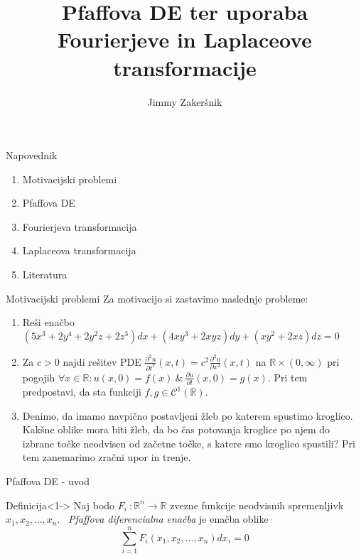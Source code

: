 \documentclass[t, 10pt]{beamer} %
\title{Pfaffova DE ter uporaba Fourierjeve in Laplaceove transformacije}
\author{Jimmy Zakeršnik}
\institute{Fakulteta za naravoslovje in matematiko}
\newcommand{\mth}[1]{\ensuremath{\mathbb{#1}}}
\newcommand{\R}{\mth{R}}
\newcommand{\pojem}[1]{\emph{#1}}
\newcommand{\map}[3]{\ensuremath{{#1}~: {#2} \rightarrow {#3}}}
\newcommand{\fillblack}[1]{
	\begin{tikzpicture}[remember picture, overlay]
		\node [shift={(0 cm,0cm)}]  at (current page.south west)
		{%
			\begin{tikzpicture}[remember picture, overlay] at (current page.south west)
				\draw [fill=black] (0, 0) -- (0,#1 \paperheight) --
				(\paperwidth,#1 \paperheight) -- (\paperwidth,0) -- cycle ;
			\end{tikzpicture}
		};
		\draw (current page.north west) rectangle (current page.south east);
	\end{tikzpicture}
}
\begin{document}
	
	\begin{frame}
		\maketitle
	\end{frame}
	
	\begin{frame}{Napovednik}
		\begin{enumerate}
			\item Motivacijski problemi
			\item Pfaffova DE
			\item Fourierjeva transformacija
			\item Laplaceova transformacija
			\item Literatura
		\end{enumerate}
		
	\end{frame}
	
	\begin{frame}{Motivacijski problemi}
		Za motivacijo si zastavimo naslednje probleme:
		\begin{enumerate}
			\item Reši enačbo $(5x^3 + 2y^4 + 2y^2z + 2z^3)dx + (4xy^3 + 2xyz)dy + (xy^2 + 2xz)dz = 0$
			\item Za $c>0$ najdi rešitev PDE $\frac{\partial^2 u}{\partial t^2}(x, t) = c^2\frac{\partial^2 u}{\partial x^2}(x, t)$ na $\R\times (0, \infty)$ pri pogojih $\forall x\in \R: u(x, 0) = f(x)~\&~\frac{\partial u}{\partial t}(x, 0) = g(x)$. Pri tem predpostavi, da sta funkciji $f, g \in \mathcal{C}^1(\R)$.
			\item Denimo, da imamo navpično postavljeni žleb po katerem spustimo kroglico. Kakšne oblike mora biti žleb, da bo čas potovanja kroglice po njem do izbrane točke neodvisen od začetne točke, s katere smo kroglico spustili? Pri tem zanemarimo zračni upor in trenje.
		\end{enumerate}
		
	\end{frame}
	
	\begin{frame}{Pfaffova DE - uvod}
		
		\begin{block}{Definicija}<1->
			Naj bodo $\map{F_i}{\R^n}{\R}$ zvezne funkcije neodvisnih spremenljivk $x_1, x_2, \ldots, x_n$. ~\pojem{Pfaffova diferencialna enačba} je enačba oblike $$\sum_{i = 1}^{n}F_i(x_1, x_2, \ldots, x_n) dx_i = 0$$
		\end{block}
		
	\end{frame}
	
\end{document}
